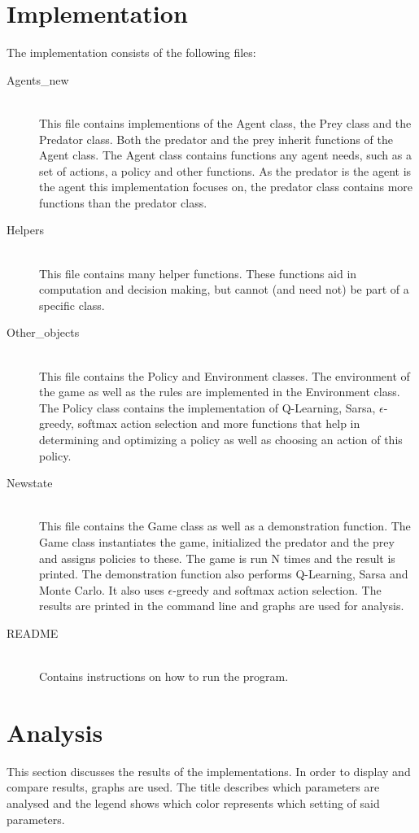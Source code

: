 \documentclass{article}
\begin{document}
\section{Implementation}
The implementation consists of the following files:
\begin{description}
	\item[Agents\_new] \hfill \\ 
	This file contains implementions of the Agent class, the Prey class and the Predator class. Both the predator and the prey inherit functions of the Agent class. The Agent class contains functions any agent needs, such as a set of actions, a policy and other functions. As the predator is the agent is the agent this implementation focuses on, the predator class contains more functions than the predator class.
	
	\item[Helpers] \hfill \\ 
	This file contains many helper functions. These functions aid in computation and decision making, but cannot (and need not) be part of a specific class.
	
	\item[Other\_objects] \hfill \\ %
	This file contains the Policy and Environment classes. The environment of the game as well as the rules are implemented in the Environment class. The Policy class contains the implementation of Q-Learning, Sarsa, $\epsilon$-greedy, softmax action selection and more functions that help in determining and optimizing a policy as well as choosing an action of this policy.
	\item[Newstate] \hfill \\ 
	This file contains the Game class as well as a demonstration function. The Game class instantiates the game, initialized the predator and the prey and assigns policies to these. The game is run N times and the result is printed. The demonstration function also performs Q-Learning, Sarsa and Monte Carlo. It also uses $\epsilon$-greedy and softmax action selection. The results are printed in the command line and graphs are used for analysis.
	\item[README] \hfill \\
	Contains instructions on how to run the program.
\end{description}
\pagebreak
\section{Analysis}
This section discusses the results of the implementations. In order to display and compare results, graphs are used. The title describes which parameters are analysed and the legend shows which color represents which setting of said parameters.
\end{document}
